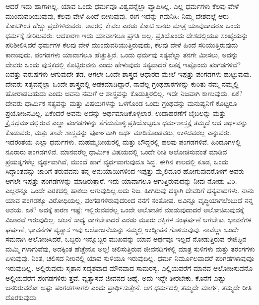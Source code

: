 ಆದರೆ ಇದು ಹಾಗಾಗಿಲ್ಲ. ಯಾವ ಒಂದು ಧರ್ಮವೂ ವಿಶ್ವವನ್ನೆಲ್ಲಾ ವ್ಯಾಪಿಸಿಲ್ಲ. ಎಲ್ಲ ಧರ್ಮಗಳು ಕೆಲವು ವೇಳೆ ಮುಂದುವರಿಯುವುವು, ಕೆಲವು ವೇಳೆ ಹಿಂದೆ ಬೀಳುವುವು. ಈಗ ಇದನ್ನು ಗಮನಿಸಿ: ನಿಮ್ಮ ದೇಶದಲ್ಲೆ ಆರು ಕೋಟಿಗಿಂತ ಹೆಚ್ಚು ಪ್ರಜೆಗಳಿರುವರು. ಅವರಲ್ಲಿ ಕೇವಲ ಎರಡು ಕೋಟಿ ಜನರು ಮಾತ್ರ ಯಾವುದಾದರೂ ಒಂದು ಧರ್ಮಕ್ಕೆ ಸೇರಿರುವರು. ಆದಕಾರಣ ಇದು ಯಾವಾಗಲೂ ಪ್ರಗತಿ ಅಲ್ಲ. ಪ್ರತಿಯೊಂದು ದೇಶದಲ್ಲಿಯೂ ಸಂಖ್ಯೆಯನ್ನು ಪರಿಶೀಲಿಸಿದರೆ ಧರ್ಮಗಳ ಕೆಲವು ವೇಳೆ ಮುಂದುವರಿಯುತ್ತಿರುವುದು, ಕೆಲವು ವೇಳೆ ಹಿಂದೆ ಸರಿಯುತ್ತಿರುವುದು ಕಾಣುವುದು. ಪಂಗಡಗಳು ಯಾವಾಗಲೂ ಹೆಚ್ಚುತ್ತಿವೆ. ಒಂದು ಧರ್ಮವು ಸತ್ಯವೆಲ್ಲಾ ತನಗೇ ಮೀಸಲು, ಅದನ್ನು ದೇವರು ಒಂದು ಪುಸ್ತಕದಲ್ಲಿ ಕೊಟ್ಟಿರುವನು ಎಂದು ಹೇಳುವುದು ಸತ್ಯವಾದರೆ ಏತಕ್ಕೆ ಇಷ್ಟೊಂದು ಪಂಗಡಗಳಿವೆ? ಐವತ್ತು ವರುಷಗಳು ಆಗುವುದೇ ತಡ, ಆಗಲೇ ಒಂದೇ ಶಾಸ್ತ್ರದ ಆಧಾರದ ಮೇಲೆ ಇಪ್ಪತ್ತು ಪಂಗಡಗಳು ಹುಟ್ಟುವುವು. ದೇವರು ಸತ್ಯವನ್ನೆಲ್ಲಾ ಒಂದೇ ಶಾಸ್ತ್ರದಲ್ಲಿ ಅಡಕಮಾಡಿದ್ದಾರೆ, ನಾವೆಲ್ಲ ಗ್ರಂಥಪಾಠಗಳನ್ನು ಕುರಿತು ನಮ್ಮ ನಮ್ಮಲ್ಲಿ ಹೋರಾಡಬಹುದು ಎಂದು ಅವನು ನಮಗೆ ಆ ಶಾಸ್ತ್ರವನ್ನು ಕೊಡುತ್ತಿರಲಿಲ್ಲ. ಇದೇ ನಿಜವಾಗಿ ಕಾಣುವುದು. ಏಕೆ? ದೇವರು ಧಾರ್ಮಿಕ ಸತ್ಯವನ್ನು ಮತ್ತು ವಿಷಯಗಳನ್ನು ಒಳಗೊಂಡ ಒಂದು ಗ್ರಂಥವನ್ನು ಮನುಷ್ಯನಿಗೆ ಕೊಟ್ಟರೂ ಪ್ರಯೋಜನವಿಲ್ಲ. ಏಕೆಂದರೆ ಅವನು ಅದನ್ನು ಅರ್ಥಮಾಡಿಕೊಳ್ಳಲಾರ. ಉದಾಹರಣೆಗೆ ಬೈಬಲನ್ನು ಮತ್ತು ಕ್ರೈಸ್ತಧರ್ಮದಲ್ಲಿರುವ ಎಲ್ಲಾ ಪಂಗಡಗಳನ್ನು ತೆಗೆದುಕೊಳ್ಳಿ.ಪ್ರತಿಯೊಬ್ಬರೂ ಧರ್ಮಶಾಸ್ತ್ರಕ್ಕೆ ತಮ್ಮದೆ ಆದ ಅರ್ಥವನ್ನು ಕೊಡುವರು, ಮತ್ತು ತಾವೇ ಶಾಸ್ತ್ರವನ್ನು ಪೂರ್ಣವಾಗಿ ಅರ್ಥ ಮಾಡಿಕೊಂಡವರು, ಉಳಿದವರಲ್ಲ ಎನ್ನುವರು. ಇದರಂತೆಯೆ ಎಲ್ಲಾ ಧರ್ಮಗಳು. ಮಹಮ್ಮದೀಯರಲ್ಲಿ ಮತ್ತು ಬೌದ್ಧರಲ್ಲಿ ಹಲವು ಪಂಗಡಗಳಿವೆ. ಹಿಂದೂಗಳಲ್ಲಿ ನೂರಾರು ಪಂಗಡಗಳಿವೆ. ಮಾನವರೆಲ್ಲ ಧಾರ್ಮಿಕ ವಿಷಯದಲ್ಲಿ ಒಂದೇ ರೀತಿ ಆಲೋಚಿಸುವಂತೆ ಮಾಡಿದ ಪ್ರಯತ್ನಗಳೆಲ್ಲ ವ್ಯರ್ಥವಾಗಿವೆ, ಮುಂದೆ ಹಾಗೆ ವ್ಯರ್ಥವಾಗುವುದೂ ಸಿದ್ಧ. ಈಗಿನ ಕಾಲದಲ್ಲಿ ಕೂಡ, ಒಂದು ಸಿದ್ಧಾಂತವನ್ನು ಜಾರಿಗೆ ತರುವವನು ತನ್ನ ಅನುಯಾಯಿಗಳಿಂದ ಇಪ್ಪತ್ತು ಮೈಲಿದೂರ ಹೋಗುವುದರೊಳಗೆ ಅವರು ಆಗಲೇ ಇಪ್ಪತ್ತು ಪಂಗಡಗಳನ್ನು ಮಾಡಿರುತ್ತಾರೆ. ಇದು ಯಾವಾಗಲೂ ಆಗುತ್ತಿರುವುದನ್ನು ನೀವು ನೋಡು ವಿರಿ. ಎಲ್ಲರನ್ನೂ ಒಂದೇ ಎರಕದಲ್ಲಿ ಹಾಕಲು ಆಗುವುದಿಲ್ಲ.ಅದು ನಿಜ. ಹೀಗಿರುವು ದಕ್ಕಾಗಿ ದೇವರಿಗೆ ಧನ್ಯವಾದಗಳು. ನಾನು ಯಾವ ಪಂಗಡಕ್ಕೂ ವಿರೋಧಿಯಲ್ಲ. ಪಂಗಡಗಳಿರುವುದರಿಂದ ನನಗೆ ಸಂತೋಷ. ಅವಿನ್ನೂ ವೃದ್ಧಿಯಾಗಲೆಂಬುದೆ ನನ್ನ ಆಶಯ. ಏಕೆ? ಅದಕ್ಕೆ ಕಾರಣ ಇಷ್ಟೆ: ಇಲ್ಲಿರುವವರೆಲ್ಲ ಒಂದೇ ಆಲೋಚನೆ ಮಾಡುವುದಾದರೆ ಆಲೋಚಿಸುವುದಕ್ಕೆ ವಿಚಾರವೆ ಇರುವುದಿಲ್ಲ. ಚಲನೆ ಸಾಧ್ಯ ವಾಗಬೇಕಾದರೆ ಎರಡು ಮೂರು ಶಕ್ತಿಗಳ ಸಂಘರ್ಷಣೆ ಆಗಬೇಕು. ಭಾವನೆಗಳ ಘರ್ಷಣೆ, ಭಾವನೆಗಳ ವ್ಯತ್ಯಾಸ ಇವು ಆಲೋಚನೆಯನ್ನು ನಮ್ಮಲ್ಲಿ ಉದ್ದೀಪನ ಗೊಳಿಸುವುವು. ನಾವೆಲ್ಲಾ ಒಂದೇ ಸಮನಾಗಿ ಆಲೋಚಿಸಿದರೆ, ಒಬ್ಬರು ಇನ್ನೊಬ್ಬರ ಮುಖವನ್ನು ಯಾವ ಅರ್ಥವೂ ಇಲ್ಲದೆ ನೋಡುತ್ತಿರುವ ಈಜಿಪ್ಟಿನ ಮಮ್ಮಿ ಗಳಾಗುವೆವು, ಅದಕ್ಕಿಂತ ಹೆಚ್ಚೇನೂ ಅಲ್ಲ! ಚಲಿಸುತ್ತಿರುವ ಜೀವನದಿಗಳಲ್ಲಿ ಮಾತ್ರ ಸುಳಿಗಳು ಮತ್ತು ತರಂಗಗಳು ಏಳುವುವು. ನಿಂತ, ಚಲಿಸದ ನೀರಿನಲ್ಲಿ ಯಾವ ಸುಳಿಯೂ ಇರುವುದಿಲ್ಲ. ಧರ್ಮ ನಿರ್ಮೂಲವಾದರೆ ಪಂಗಡಗಳಾವುವೂ ಇರುವುದಿಲ್ಲ. ಅಲ್ಲಿರುವುದು ಸ್ಮಶಾನ ಸದೃಶವಾದ ಮೌನವಾದ ಸಾಮರಸ್ಯ. ಎಲ್ಲಿಯವರೆಗೆ ಮಾನವ ಆಲೋಚಿಸುವನೊ ಅಲ್ಲಿಯವರೆಗೆ ಪಂಗಡಗಳಿರು ತ್ತವೆ. ವ್ಯತ್ಯಾಸವೆ ಜೀವನದ ಚಿಹ್ನೆ. ಅದು ಇದ್ದೇ ತೀರಬೇಕು. ಕೊನೆಗೆ ಎಷ್ಟು ಜನರಿರುವರೋ ಅಷ್ಟು ಪಂಗಡಗಳಾಗಲಿ ಎಂದು ಪ್ರಾರ್ಥಿಸುತ್ತೇನೆ. ಆಗ ಧರ್ಮದಲ್ಲಿ ತಮ್ಮದೇ ಮಾರ್ಗ, ತಮ್ಮದೇ ರೀತಿ ದೊರಕುವುದು.

